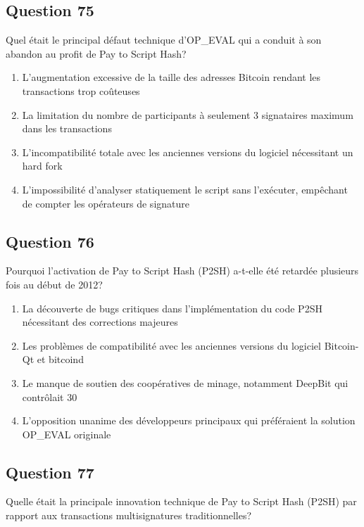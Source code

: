 \documentclass[12pt,a4paper]{article}
\begin{document}
\bigskip


\subsection*{Question 75}
Quel était le principal défaut technique d'OP_EVAL qui a conduit à son abandon au profit de Pay to Script Hash?

\begin{enumerate}[label=\Alph*., leftmargin=*]
\item L'augmentation excessive de la taille des adresses Bitcoin rendant les transactions trop coûteuses
\item La limitation du nombre de participants à seulement 3 signataires maximum dans les transactions
\item L'incompatibilité totale avec les anciennes versions du logiciel nécessitant un hard fork
\item L'impossibilité d'analyser statiquement le script sans l'exécuter, empêchant de compter les opérateurs de signature
\end{enumerate}

\bigskip


\subsection*{Question 76}
Pourquoi l'activation de Pay to Script Hash (P2SH) a-t-elle été retardée plusieurs fois au début de 2012?

\begin{enumerate}[label=\Alph*., leftmargin=*]
\item La découverte de bugs critiques dans l'implémentation du code P2SH nécessitant des corrections majeures
\item Les problèmes de compatibilité avec les anciennes versions du logiciel Bitcoin-Qt et bitcoind
\item Le manque de soutien des coopératives de minage, notamment DeepBit qui contrôlait 30%
\item L'opposition unanime des développeurs principaux qui préféraient la solution OP_EVAL originale
\end{enumerate}

\bigskip


\subsection*{Question 77}
Quelle était la principale innovation technique de Pay to Script Hash (P2SH) par rapport aux transactions multisignatures traditionnelles?
\end{document}
